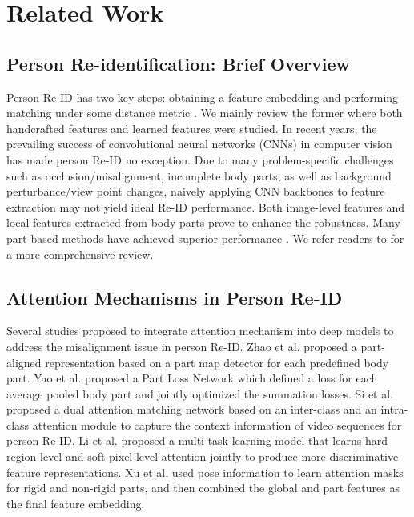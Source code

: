 \documentclass[10pt,twocolumn]{article}
\begin{document}
\section{Related Work} \label{sec:rw}

\subsection{Person Re-identification: Brief Overview} Person Re-ID has two key steps: obtaining a feature embedding and performing matching under some distance metric \cite{weinberger2006distance, li2013learning, khamis2014joint}. We mainly review the former where both handcrafted features \cite{khamis2014joint, koestinger2012large, li2013locally, ma2012bicov} and learned features \cite{li2014deepreid, zhao2014learning, cheng2016person, hermans2017defense, liao2017triplet} were studied. 
In recent years, the prevailing success of convolutional neural networks (CNNs) in computer vision has made person Re-ID no exception. Due to many problem-specific challenges such as occlusion/misalignment, incomplete body parts, as well as background perturbance/view point changes, 
naively applying CNN backbones to feature extraction may not yield ideal Re-ID performance. Both image-level features and local features extracted from body parts prove to enhance the robustness. Many part-based methods have achieved superior performance \cite{gray2008viewpoint, prosser2010person, liao2015person, ma2013domain, zheng2013reidentification, cheng2016person, su2017pose, wei2017glad, zheng2017pose, zhu2017part, suh2018part, zhao2017deeply, zhao2017spindle}. We refer readers to \cite{zheng2016person} for a more comprehensive review.









\subsection{Attention Mechanisms in Person Re-ID}
Several studies proposed to integrate attention mechanism into deep models to address the misalignment issue in person Re-ID. Zhao et al. \cite{zhao2017deeply} proposed a part-aligned representation based on a part map detector for each predefined body part. Yao et al. \cite{yao2017deep} proposed a Part Loss Network which defined a loss for each average pooled body part and jointly optimized the summation losses. Si et al. \cite{si2018dual} proposed a dual attention matching network based on an inter-class and an intra-class attention module to capture the context information of video sequences for person Re-ID. Li et al. \cite{li2018harmonious} proposed a multi-task learning model that learns hard region-level and soft pixel-level attention jointly to produce more discriminative feature representations. Xu et al. \cite{xu2018attention} used pose information to learn attention masks for rigid and non-rigid parts, and then combined the global and part features as the final feature embedding.
\end{document}
